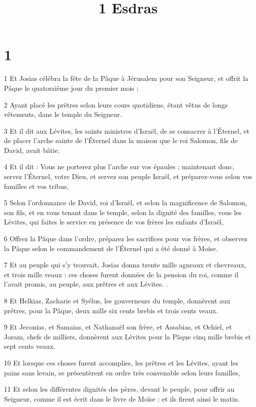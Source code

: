 

\title{1 Esdras}


\chapter{1}

\par 1 Et Josias célébra la fête de la Pâque à Jérusalem pour son Seigneur, et offrit la Pâque le quatorzième jour du premier mois ;
\par 2 Ayant placé les prêtres selon leurs cours quotidiens, étant vêtus de longs vêtements, dans le temple du Seigneur.
\par 3 Et il dit aux Lévites, les saints ministres d'Israël, de se consacrer à l'Éternel, et de placer l'arche sainte de l'Éternel dans la maison que le roi Salomon, fils de David, avait bâtie.
\par 4 Et il dit : Vous ne porterez plus l'arche sur vos épaules ; maintenant donc, servez l'Éternel, votre Dieu, et servez son peuple Israël, et préparez-vous selon vos familles et vos tribus,
\par 5 Selon l'ordonnance de David, roi d'Israël, et selon la magnificence de Salomon, son fils, et en vous tenant dans le temple, selon la dignité des familles, vous les Lévites, qui faites le service en présence de vos frères les enfants d'Israël,
\par 6 Offrez la Pâque dans l'ordre, préparez les sacrifices pour vos frères, et observez la Pâque selon le commandement de l'Éternel qui a été donné à Moïse.
\par 7 Et au peuple qui s'y trouvait, Josias donna trente mille agneaux et chevreaux, et trois mille veaux : ces choses furent données de la pension du roi, comme il l'avait promis, au peuple, aux prêtres et aux Lévites. .
\par 8 Et Helkias, Zacharie et Syélus, les gouverneurs du temple, donnèrent aux prêtres, pour la Pâque, deux mille six cents brebis et trois cents veaux.
\par 9 Et Jeconias, et Samaias, et Nathanaël son frère, et Assabias, et Ochiel, et Joram, chefs de milliers, donnèrent aux Lévites pour la Pâque cinq mille brebis et sept cents veaux.
\par 10 Et lorsque ces choses furent accomplies, les prêtres et les Lévites, ayant les pains sans levain, se présentèrent en ordre très convenable selon leurs familles,
\par 11 Et selon les différentes dignités des pères, devant le peuple, pour offrir au Seigneur, comme il est écrit dans le livre de Moïse : et ils firent ainsi le matin.
